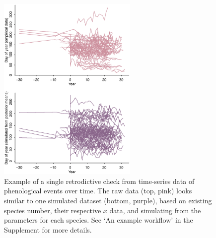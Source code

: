 \documentclass[11pt]{article}
\begin{document}
\begin{figure}[ht]
\centering
\noindent \includegraphics[width=0.6\textwidth]{rawvsonepredictivecheck.eps}
\caption{Example of a single retrodictive check from time-series data of phenological events over time. The raw data (top, pink) looks similar to one simulated dataset (bottom, purple), based on existing species number, their respective $x$ data, and simulating from the parameters for each species. See `An example workflow' in the Supplement for more details.}
\label{fig:retrodictivecheck}
\end{figure}
\end{document}
